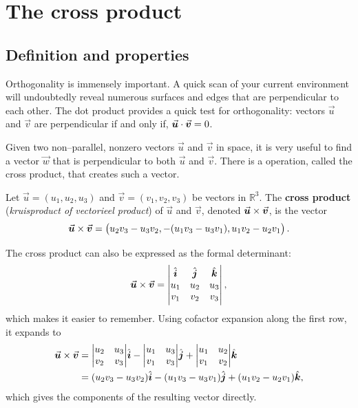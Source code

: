 \fi
\fi

\ifcourse


\section{The cross product}
\label{sec:cross_product}
\ifanalysis\subsection{Definition and properties}\fi
Orthogonality is immensely important. A quick scan of your current environment will undoubtedly reveal numerous surfaces and edges that are perpendicular to each other. The dot product provides a quick test for orthogonality:  vectors $\vec u$ and $\vec v$ are perpendicular if and only if, $\dotp uv=0$.




Given two non--parallel, nonzero vectors $\vec u$ and $\vec v$ in space, it is very useful to find a vector $\vec w$ that is perpendicular to both $\vec u$ and $\vec v$. There is a operation, called the cross product, that creates such a vector.

\begin{definition}\label{def:cross_product}
Let $\vec u =\left( u_1,u_2,u_3\right)$ and $\vec v = \left( v_1,v_2,v_3\right)$ be vectors in $\mathbb{R}^3$. The \textbf{cross product} (\textit{kruisproduct of vectorieel product}) of $\vec u$ and $\vec v$, denoted $\crossp uv$, is the vector
$$
\crossp uv = \left( u_2v_3-u_3v_2,-(u_1v_3-u_3v_1),u_1v_2-u_2v_1\right).
$$
\end{definition}

\ifanalysis

The cross product can also be expressed as the formal determinant:
\renewcommand{\arraystretch}{1}
$$
\crossp uv  ={\begin{vmatrix}\hat {i} &\hat {j} &\hat {k} \\u_{1}&u_{2}&u_{3}\\v_{1}&v_{2}&v_{3}\\\end{vmatrix}}\,,
$$
which makes it easier to remember. Using cofactor expansion along the first row, it expands to
$$
{\displaystyle {\begin{aligned}\crossp uv  &={\begin{vmatrix}u_{2}&u_{3}\\v_{2}&v_{3}\end{vmatrix}}\hat {i} -{\begin{vmatrix}u_{1}&u_{3}\\v_{1}&v_{3}\end{vmatrix}}\hat {j} +{\begin{vmatrix}u_{1}&u_{2}\\v_{1}&v_{2}\end{vmatrix}}\hat {k} \\&=(u_{2}v_{3}-u_{3}v_{2})\hat {i} -(u_{1}v_{3}-u_{3}v_{1})\hat {j} +(u_{1}v_{2}-u_{2}v_{1})\hat {k} ,\end{aligned}}}
$$
which gives the components of the resulting vector directly. 


